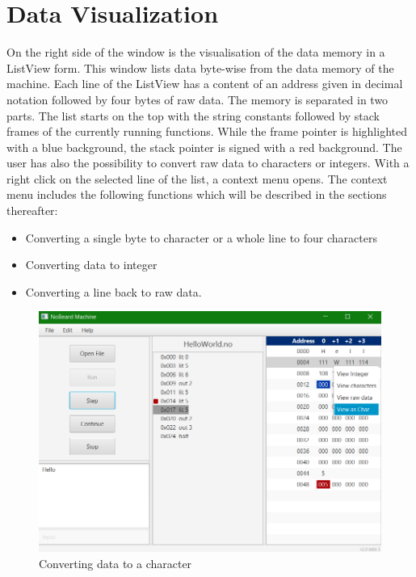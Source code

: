 \section{Data Visualization}
On the right side of the window is the visualisation of the data memory in a ListView form. This window lists data byte-wise from the data memory of the machine. Each line of the ListView has a content of an address given in decimal notation followed by four bytes of raw data. The memory is separated in two parts. The list starts on the top with the string constants followed by stack frames of the currently running functions. While the frame pointer is highlighted with a blue background, the stack pointer is signed with a red background. The user has also the possibility to convert raw data to characters or integers.
With a right click on the selected line of the list, a context menu opens. The context menu includes the following functions which will be described in the sections thereafter:
\begin{itemize}
\item Converting a single byte to character or a whole line to four characters
\item Converting data to integer 
\item Converting a line back to raw data. 
\end{itemize}
\begin{figure}[h] 
	\centering
	\includegraphics[scale=.80]{images/screenshot-3.png}
	\caption{Converting data to a character}
	\label{fig:convertToChar}
\end{figure}
